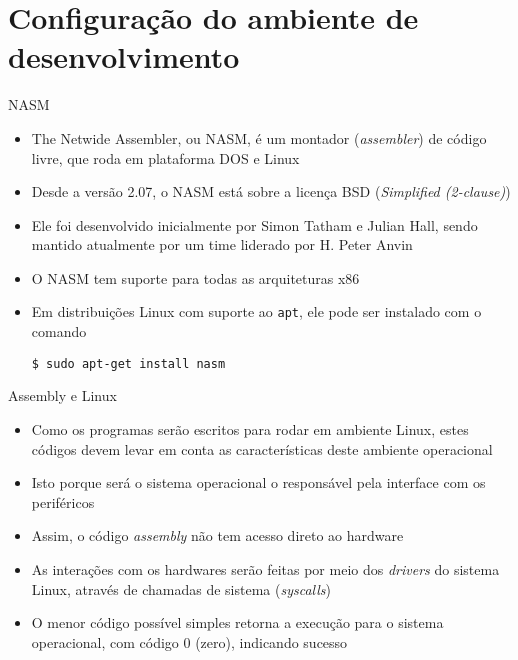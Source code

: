 \section{Configuração do ambiente de desenvolvimento}

\begin{frame}[fragile]{NASM}

    \begin{itemize}
        \item The Netwide Assembler, ou NASM, é um montador (\textit{assembler}) de código livre,
            que roda em plataforma DOS e Linux

        \item Desde a versão 2.07, o NASM está sobre a licença BSD (\textit{Simplified (2-clause)})

        \item Ele foi desenvolvido inicialmente por Simon Tatham e Julian Hall, sendo mantido
            atualmente por um time liderado por H. Peter Anvin

        \item O NASM tem suporte para todas as arquiteturas x86

        \item Em distribuições Linux com suporte ao \texttt{apt}, ele pode ser instalado com o
        comando
        \begin{center}
            \verb|$ sudo apt-get install nasm|
        \end{center}
    \end{itemize}

\end{frame}

\begin{frame}[fragile]{Assembly e Linux}

    \begin{itemize}
        \item Como os programas serão escritos para rodar em ambiente Linux, estes códigos devem
            levar em conta as características deste ambiente operacional

        \item Isto porque será o sistema operacional o responsável pela interface com os
            periféricos

        \item Assim, o código \textit{assembly} não tem acesso direto ao hardware

        \item As interações com os hardwares serão feitas por meio dos \textit{drivers} do sistema
            Linux, através de chamadas de sistema (\textit{syscalls})

        \item O menor código possível simples retorna a execução para o sistema operacional, 
            com código 0 (zero), indicando sucesso 

    \end{itemize}

\end{frame}

